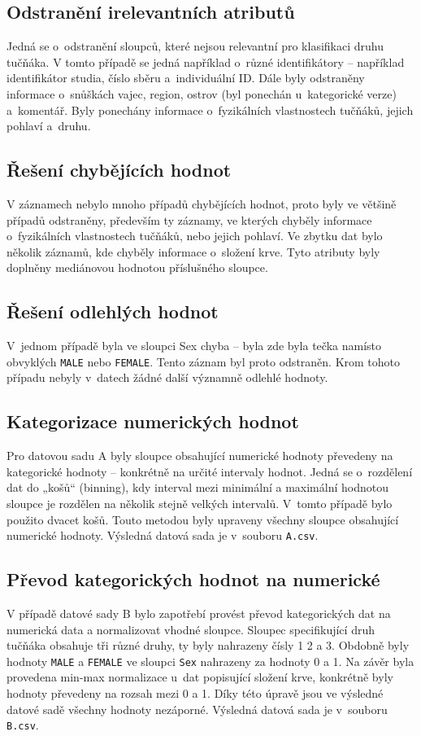 \documentclass[10pt,xcolor=pdflatex,dvipsnames,table,oneside]{book}
\begin{document}
\subsection{Odstranění irelevantních atributů}
Jedná se o~odstranění sloupců, které nejsou relevantní pro klasifikaci druhu tučňáka. V tomto případě se jedná například o~různé identifikátory – například identifikátor studia, číslo sběru a~individuální ID. Dále byly odstraněny informace o~snůškách vajec, region, ostrov (byl ponechán u~kategorické verze) a~komentář.
Byly ponechány informace o~fyzikálních vlastnostech tučňáků, jejich pohlaví a~druhu.
\subsection{Řešení chybějících hodnot}
V záznamech nebylo mnoho případů chybějících hodnot, proto byly ve většině případů odstraněny, především ty záznamy, ve kterých chyběly informace o~fyzikálních vlastnostech tučňáků, nebo jejich pohlaví. Ve zbytku dat bylo několik záznamů, kde chyběly informace o~složení krve. Tyto atributy byly doplněny mediánovou hodnotou příslušného sloupce.
\subsection{Řešení odlehlých hodnot}
V~jednom případě byla ve sloupci Sex chyba – byla zde byla tečka namísto obvyklých \verb|MALE| nebo \verb|FEMALE|. Tento záznam byl proto odstraněn. Krom tohoto případu nebyly v~datech žádné další významně odlehlé hodnoty.
\subsection{Kategorizace numerických hodnot}
Pro datovou sadu A byly sloupce obsahující numerické hodnoty převedeny na kategorické hodnoty – konkrétně na určité intervaly hodnot. Jedná se o~rozdělení dat do „košů“ (binning), kdy interval mezi minimální a maximální hodnotou sloupce je rozdělen na několik stejně velkých intervalů. V~tomto případě bylo použito dvacet košů. Touto metodou byly upraveny všechny sloupce obsahující numerické hodnoty. Výsledná datová sada je v~souboru \verb|A.csv|.
\subsection{Převod kategorických hodnot na numerické}
V případě datové sady B bylo zapotřebí provést převod kategorických dat na numerická data a normalizovat vhodné sloupce. Sloupec specifikující druh tučňáka obsahuje tři různé druhy, ty byly nahrazeny čísly 1 2 a 3. Obdobně byly hodnoty \verb|MALE| a \verb|FEMALE| ve sloupci \verb|Sex| nahrazeny za hodnoty 0 a 1. Na závěr byla provedena min-max normalizace u~dat popisující složení krve, konkrétně byly hodnoty převedeny na rozsah mezi 0 a 1. Díky této úpravě jsou ve výsledné datové sadě všechny hodnoty nezáporné. Výsledná datová sada je v~souboru \verb|B.csv|.
\end{document}
